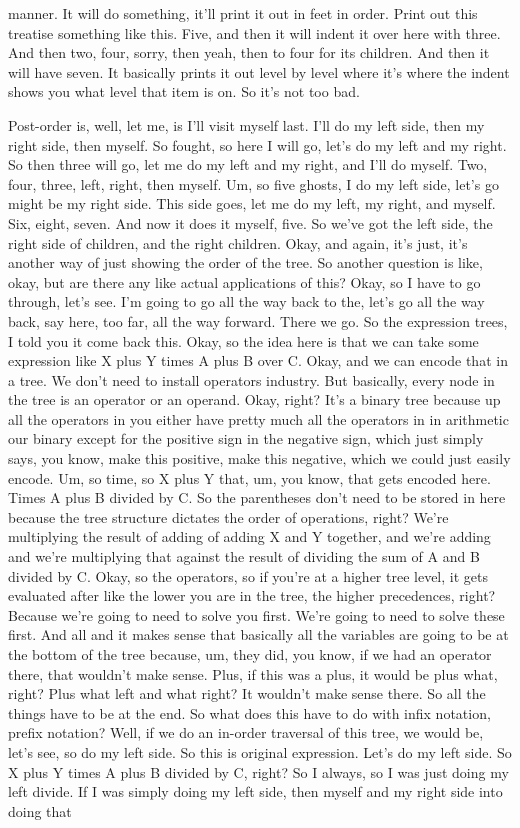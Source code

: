manner. It will do something, it'll print it out in feet in order. Print out this treatise something like this. Five, and then it will indent it over here with three. And then two, four, sorry, then yeah, then to four for its children. And then it will have seven. It basically prints it out level by level where it's where the indent shows you what level that item is on. So it's not too bad.

Post-order is, well, let me, is I'll visit myself last. I'll do my left side, then my right side, then myself. So fought, so here I will go, let's do my left and my right. So then three will go, let me do my left and my right, and I'll do myself. Two, four, three, left, right, then myself. Um, so five ghosts, I do my left side, let's go might be my right side. This side goes, let me do my left, my right, and myself. Six, eight, seven. And now it does it myself, five. So we've got the left side, the right side of children, and the right children. Okay, and again, it's just, it's another way of just showing the order of the tree. So another question is like, okay, but are there any like actual applications of this? Okay, so I have to go through, let's see. I'm going to go all the way back to the, let's go all the way back, say here, too far, all the way forward. There we go. So the expression trees, I told you it come back this. Okay, so the idea here is that we can take some expression like X plus Y times A plus B over C. Okay, and we can encode that in a tree. We don't need to install operators industry. But basically, every node in the tree is an operator or an operand. Okay, right? It's a binary tree because up all the operators in you either have pretty much all the operators in in arithmetic our binary except for the positive sign in the negative sign, which just simply says, you know, make this positive, make this negative, which we could just easily encode. Um, so time, so X plus Y that, um, you know, that gets encoded here. Times A plus B divided by C. So the parentheses don't need to be stored in here because the tree structure dictates the order of operations, right? We're multiplying the result of adding of adding X and Y together, and we're adding and we're multiplying that against the result of dividing the sum of A and B divided by C. Okay, so the operators, so if you're at a higher tree level, it gets evaluated after like the lower you are in the tree, the higher precedences, right? Because we're going to need to solve you first. We're going to need to solve these first. And all and it makes sense that basically all the variables are going to be at the bottom of the tree because, um, they did, you know, if we had an operator there, that wouldn't make sense. Plus, if this was a plus, it would be plus what, right? Plus what left and what right? It wouldn't make sense there. So all the things have to be at the end. So what does this have to do with infix notation, prefix notation? Well, if we do an in-order traversal of this tree, we would be, let's see, so do my left side. So this is original expression. Let's do my left side. So X plus Y times A plus B divided by C, right? So I always, so I was just doing my left divide. If I was simply doing my left side, then myself and my right side into doing that 